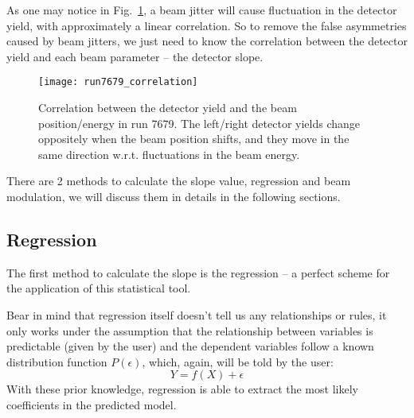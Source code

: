 As one may notice in Fig.~\ref{fig:correlation}, a beam jitter will cause 
fluctuation in the detector yield, with approximately a linear correlation.
So to remove the false asymmetries caused by beam jitters, we just need to
know the correlation between the detector yield and each beam parameter -- 
the detector slope. 

\begin{figure}[!h]
    \centering
    \texttt{[image: run7679\_correlation]}
    \caption{Correlation between the detector yield and the beam position/energy in run 7679.
    The left/right detector yields change oppositely when the beam position shifts,
    and they move in the same direction w.r.t. fluctuations in the beam energy.
    }
    \label{fig:correlation}
\end{figure}

There are 2 methods to calculate the slope value, regression and beam modulation,
we will discuss them in details in the following sections.

\subsection{Regression}

The first method to calculate the slope is the regression -- a perfect scheme for
the application of this statistical tool.

Bear in mind that regression itself doesn't tell us any relationships or rules, 
it only works under
the assumption that the relationship between variables is predictable (given by the user) 
and the dependent variables follow a known distribution function $P(\epsilon)$, which,
again, will be told by the user:
$$ Y = f(X) + \epsilon $$
With these prior knowledge, regression is able to extract the most likely 
coefficients in the predicted model.

\begin{comment}
For example, the famous least square fit is actually a linear regression 
$$ Y = c_0 + \sum c_i x_i + \epsilon $$
assuming Gaussian distribution of the dependent variable: $\epsilon \sim N(0, \sigma)$
Another frequenctly used scene is logistic regression for classification, which
is very similar to linear regression except f(X) will be converted into a
probability function, e.g. using the logistic function:
$$ h(z) = \frac{e^z}{1 + e^z} \quad z = f(X) $$

The assumpsion we made here is that the fluctuations in beam parameters in small, 
compared to their normal yield -- this can be verified by their yield plot. So
that we can use first order fit to model the detector's response to change in
beam parameters. Therefore the `true' asymmetry will be:
\begin{equation}
    \CA_{cor} = \CA_{raw} - \sum_i \beta_i\Delta M_i
\end{equation}
where $\CA_{cor}$ is the corrected asymmetry, $\beta_i = \frac{\partial \CA_{raw}}{\Delta M_i}$ 
is the slope and $\Delta M$ is the difference of BPM yield bewtween 
opposite helicities windows, i sums over all 5 chosen BPMs.
\end{comment}

